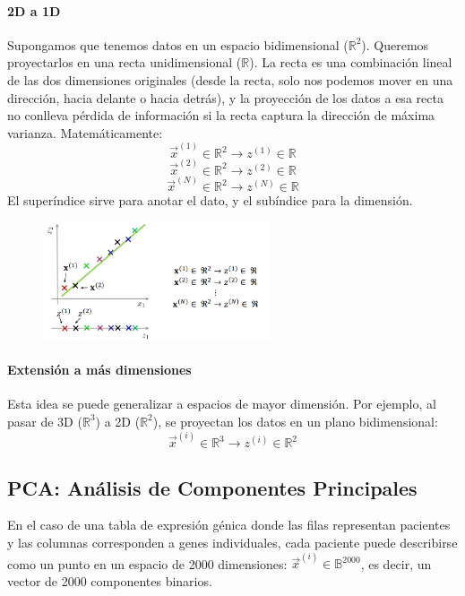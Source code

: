\paragraph{2D a 1D}
Supongamos que tenemos datos en un espacio bidimensional ($\mathbb{R}^2$). Queremos proyectarlos en una recta unidimensional ($\mathbb{R}$). La recta es una combinación lineal de las dos dimensiones originales (desde la recta, solo nos podemos mover en una dirección, hacia delante o hacia detrás), y la proyección de los datos a esa recta no conlleva pérdida de información si la recta captura la dirección de máxima varianza. Matemáticamente:
$$\vec{x}^{(1)} \in \mathbb{R}^2 \rightarrow z^{(1)} \in \mathbb{R}$$
$$\vec{x}^{(2)} \in \mathbb{R}^2 \rightarrow z^{(2)} \in \mathbb{R}$$
$$\vec{x}^{(N)} \in \mathbb{R}^2 \rightarrow z^{(N)} \in \mathbb{R}$$
El superíndice sirve para anotar el dato, y el subíndice para la dimensión.

\begin{figure}[h]
\centering
\includegraphics[width = 0.6\textwidth]{figs/reduccion-dimension-2d.png}
\end{figure}

\paragraph{Extensión a más dimensiones}
Esta idea se puede generalizar a espacios de mayor dimensión. Por ejemplo, al pasar de 3D ($\mathbb{R}^3$) a 2D ($\mathbb{R}^2$), se proyectan los datos en un plano bidimensional:
$$\vec{x}^{(i)} \in \mathbb{R}^3 \rightarrow z^{(i)} \in \mathbb{R}^2$$

\subsection{PCA: Análisis de Componentes Principales}
En el caso de una tabla de expresión génica donde las filas representan pacientes y las columnas corresponden a genes individuales, cada paciente puede describirse como un punto en un espacio de 2000 dimensiones: $\vec{x}^{(i)} \in \mathbb{B}^{2000}$, es decir, un vector de 2000 componentes binarios.


